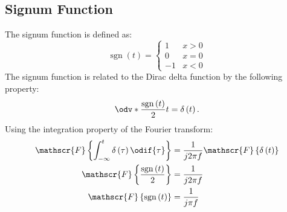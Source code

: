 \documentclass{article}
\DeclareMathOperator{\sgn}{sgn}
\begin{document}
\subsection{Signum Function}
The signum function is defined as:
\begin{equation*}
    \sgn{\left( t \right)} =
    \begin{cases}
        1  & x > 0 \\
        0  & x = 0 \\
        -1 & x < 0
    \end{cases}
\end{equation*}
The signum function is related to the Dirac delta function by the following property:
\begin{equation*}
    \odv*{\frac{\sgn{\left( t \right)}}{2}}{t} = \delta\left( t \right).
\end{equation*}
Using the integration property of the Fourier transform:
\begin{align*}
    \mathscr{F}\left\{ \int_{-\infty}^t \delta\left( \tau \right) \odif{\tau} \right\} & = \frac{1}{j 2 \pi f} \mathscr{F}\left\{ \delta\left( t \right) \right\} \\
    \mathscr{F}\left\{ \frac{\sgn\left( t \right)}{2} \right\}                         & = \frac{1}{j 2 \pi f}                                                    \\
    \mathscr{F}\left\{ \sgn\left( t \right) \right\}                                   & = \frac{1}{j \pi f}
\end{align*}
\end{document}
